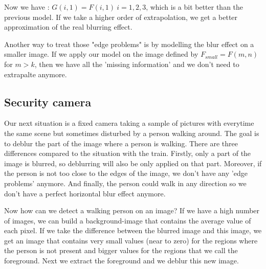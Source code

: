 Now we have : $G(i,1) = F(i,1)~i=1,2,3$, which is a bit better than the previous model. If we take a higher order of extrapolation, we get a better approximation of the real blurring effect.


Another way to treat those "edge problems" is by modelling the blur effect on a smaller image. If we apply our model on the image defined by $F_{small} = F(m,n)$ for $m>k$, then we have all the 'missing information' and we don't need to extrapalte anymore.


\subsection{Security camera}

Our next situation is a fixed camera taking a sample of pictures with everytime the same scene but sometimes disturbed by a person walking around. The goal is to deblur the part of the image where a person is walking. There are three differences compared to the situation with the train. Firstly, only a part of the image is blurred, so deblurring will also be only applied on that part. Moreover, if the person is not too close to the edges of the image, we don't have any 'edge problems' anymore. And finally, the person could walk in any direction so we don't have a perfect horizontal blur effect anymore.

Now how can we detect a walking person on an image? If we have a high number of images, we can build a background-image that contains the average value of each pixel. If we take the difference between the blurred image and this image, we get an image that contains very small values (near to zero) for the regions where the person is not present and bigger values for the regions that we call the foreground. Next we extract the foreground and we deblur this new image.

